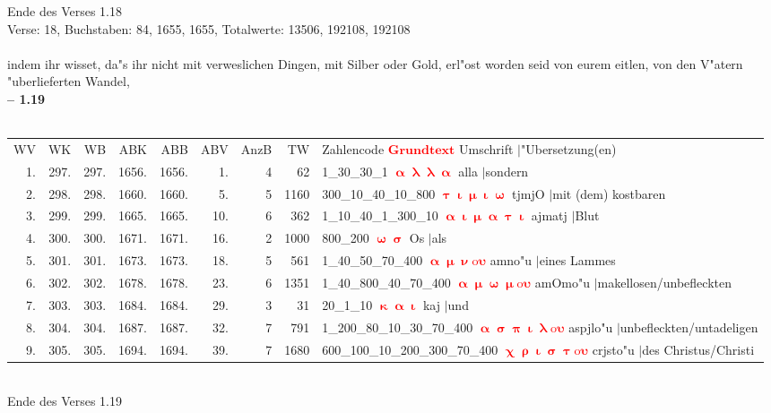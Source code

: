 \documentclass[a4paper,10pt,landscape]{article}
\begin{document}
Ende des Verses 1.18\\
Verse: 18, Buchstaben: 84, 1655, 1655, Totalwerte: 13506, 192108, 192108\\
\\
indem ihr wisset, da"s ihr nicht mit verweslichen Dingen, mit Silber oder Gold, erl"ost worden seid von eurem eitlen, von den V"atern "uberlieferten Wandel,\\
\newpage 
{\bf -- 1.19}\\
\medskip \\
\begin{tabular}{rrrrrrrrp{120mm}}
WV&WK&WB&ABK&ABB&ABV&AnzB&TW&Zahlencode \textcolor{red}{$\boldsymbol{Grundtext}$} Umschrift $|$"Ubersetzung(en)\\
1.&297.&297.&1656.&1656.&1.&4&62&1\_30\_30\_1 \textcolor{red}{$\boldsymbol{\upalpha\uplambda\uplambda\upalpha}$} alla $|$sondern\\
2.&298.&298.&1660.&1660.&5.&5&1160&300\_10\_40\_10\_800 \textcolor{red}{$\boldsymbol{\uptau\upiota\upmu\upiota\upomega}$} tjmjO $|$mit (dem) kostbaren\\
3.&299.&299.&1665.&1665.&10.&6&362&1\_10\_40\_1\_300\_10 \textcolor{red}{$\boldsymbol{\upalpha\upiota\upmu\upalpha\uptau\upiota}$} ajmatj $|$Blut\\
4.&300.&300.&1671.&1671.&16.&2&1000&800\_200 \textcolor{red}{$\boldsymbol{\upomega\upsigma}$} Os $|$als\\
5.&301.&301.&1673.&1673.&18.&5&561&1\_40\_50\_70\_400 \textcolor{red}{$\boldsymbol{\upalpha\upmu\upnu\mathrm{o}\upsilon}$} amno"u $|$eines Lammes\\
6.&302.&302.&1678.&1678.&23.&6&1351&1\_40\_800\_40\_70\_400 \textcolor{red}{$\boldsymbol{\upalpha\upmu\upomega\upmu\mathrm{o}\upsilon}$} amOmo"u $|$makellosen/unbefleckten\\
7.&303.&303.&1684.&1684.&29.&3&31&20\_1\_10 \textcolor{red}{$\boldsymbol{\upkappa\upalpha\upiota}$} kaj $|$und\\
8.&304.&304.&1687.&1687.&32.&7&791&1\_200\_80\_10\_30\_70\_400 \textcolor{red}{$\boldsymbol{\upalpha\upsigma\uppi\upiota\uplambda\mathrm{o}\upsilon}$} aspjlo"u $|$unbefleckten/untadeligen\\
9.&305.&305.&1694.&1694.&39.&7&1680&600\_100\_10\_200\_300\_70\_400 \textcolor{red}{$\boldsymbol{\upchi\uprho\upiota\upsigma\uptau\mathrm{o}\upsilon}$} crjsto"u $|$des Christus/Christi\\
\end{tabular}\medskip \\
Ende des Verses 1.19\\
\end{document}
